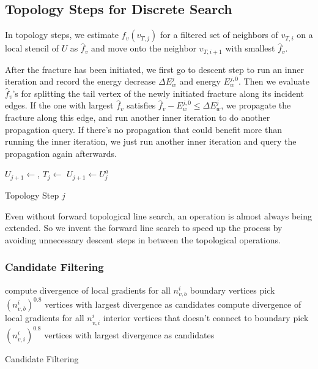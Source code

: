 
\subsection{Topology Steps for Discrete Search}
\label{sec:topologyStep}

In topology steps, we estimate $f_v(v_{T,j})$ for a filtered set of neighbors of $v_{T,i}$ on a local stencil of $U$ as $\hat{f}_v$ and move onto the neighbor $v_{T,i+1}$ with smallest $\hat{f}_v$.

After the fracture has been initiated, we first go to descent step to run an inner iteration and record the energy decrease $\Delta E_w^j$ and energy $E_w^{j,0}$. Then we evaluate $\hat{f}_v$'s for splitting the tail vertex of the newly initiated fracture along its incident edges. If the one with largest $\hat{f}_v$ satisfies $\hat{f}_v - E_w^{j,0} \leq \Delta E_w^j$, we propagate the fracture along this edge, and run another inner iteration to do another propagation query. If there's no propagation that could benefit more than running the inner iteration, we just run another inner iteration and query the propagation again afterwards.

\begin{algorithm}[h]
\SetAlgoLined
{}
{
  $U_{j+1} \leftarrow $, $T_j \leftarrow $\;
}
{
  $U_{j+1} \leftarrow U^a_j$\;
}
\caption{Topology Step $j$}
\end{algorithm}

Even without forward topological line search, an operation is almost always being extended. So we invent the forward line search to speed up the process by avoiding unnecessary descent steps in between the topological operations.

\subsubsection{Candidate Filtering}

\begin{algorithm}[h]
\SetAlgoLined
{}
{
  compute divergence of local gradients for all $n_{v,b}^i$ boundary vertices\;
  pick $(n_{v,b}^i)^{0.8}$ vertices with largest divergence as candidates\;
}
{
  compute divergence of local gradients for all $n_{v,i}^i$ interior vertices that doesn't connect to boundary\;
  pick $(n_{v,i}^i)^{0.8}$ vertices with largest divergence as candidates\;
}
\caption{Candidate Filtering}
\end{algorithm}

